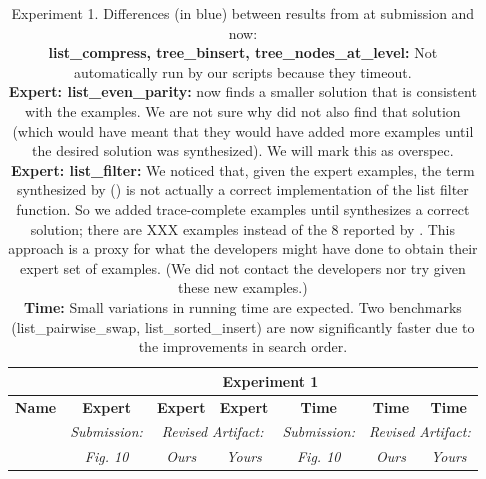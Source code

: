 \begin{table}

\experimentTableSize

\begin{tabular}{l|cccccc}
& \multicolumn{6}{c}{\textbf{Experiment 1}} \\\hline
\textbf{Name} &
\textbf{Expert} & \textbf{Expert} & \textbf{Expert} &
\textbf{Time} & \textbf{Time} & \textbf{Time} \\
&
\textit{Submission:} & \multicolumn{2}{c}{\textit{Revised Artifact:}} &
\textit{Submission:} & \multicolumn{2}{c}{\textit{Revised Artifact:}} \\
&
\textit{Fig. 10} & \textit{Ours} & \textit{Yours} &
\textit{Fig. 10} & \textit{Ours} & \textit{Yours} \\

\end{tabular}

\vspace{0.10in}

\caption{Experiment 1.
%
Differences (in blue) between results from \snsMyth{} at submission and
\snsMyth{} now:
%
\experimentCaptionSize
%
\\[3pt]
%
\textbf{list\_compress, tree\_binsert, tree\_nodes\_at\_level:} Not
automatically run by our scripts because they {\scriptsize{timeout}}.
%
\\[3pt]
%
\textbf{Expert: list\_even\_parity:} \snsMyth{} now finds a smaller solution
that is consistent with the \myth{} examples. We are not sure why \myth{} did
not also find that solution (which would have meant that they would have added
more examples until the desired solution was synthesized). We will mark this as
{\scriptsize{overspec}}.
%
\\[3pt]
%
\textbf{Expert: list\_filter:} We noticed that, given the \myth{} expert
examples, the term synthesized by \myth{} (\cite[]{XXX}) is not actually a
correct implementation of the list filter function. So we added trace-complete
examples until \snsMyth{} synthesizes a correct solution; there are XXX examples
instead of the 8 reported by \cite{XXX}. This approach is a proxy for what the
\myth{} developers might have done to obtain their expert set of examples. (We
did not contact the \myth{} developers nor try \myth{} given these new
examples.)
%
\\[3pt]
%
\textbf{Time:} Small variations in running time are expected. Two benchmarks
(list\_pairwise\_swap, list\_sorted\_insert) are now significantly faster due to
the improvements in search order.
%
}

\end{table}
